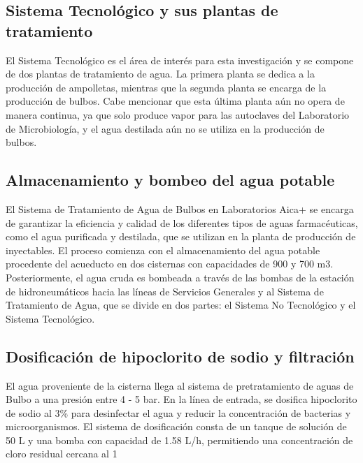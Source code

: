 
\subsection*{Sistema Tecnológico y sus plantas de tratamiento}

El Sistema Tecnológico es el área de interés para esta investigación y se compone de dos plantas de tratamiento de agua. La primera planta se dedica a la producción de ampolletas, mientras que la segunda planta se encarga de la producción de bulbos. Cabe mencionar que esta última planta aún no opera de manera continua, ya que solo produce vapor para las autoclaves del Laboratorio de Microbiología, y el agua destilada aún no se utiliza en la producción de bulbos.


\subsection{Almacenamiento y bombeo del agua potable}

El Sistema de Tratamiento de Agua de Bulbos en Laboratorios Aica+ se encarga de garantizar la eficiencia y calidad de los diferentes tipos de aguas farmacéuticas, como el agua purificada y destilada, que se utilizan en la planta de producción de inyectables. El proceso comienza con el almacenamiento del agua potable procedente del acueducto en dos cisternas con capacidades de 900 y 700 m3. Posteriormente, el agua cruda es bombeada a través de las bombas de la estación de hidroneumáticos hacia las líneas de Servicios Generales y al Sistema de Tratamiento de Agua, que se divide en dos partes: el Sistema No Tecnológico y el Sistema Tecnológico.


\subsection{Dosificación de hipoclorito de sodio y filtración}
 
El agua proveniente de la cisterna llega al sistema de pretratamiento de aguas de Bulbo a una presión entre 4 - 5 bar. En la línea de entrada, se dosifica hipoclorito de sodio al 3\% para desinfectar el agua y reducir la concentración de bacterias y microorganismos. El sistema de dosificación consta de un tanque de solución de 50 L y una bomba con capacidad de 1.58 L/h, permitiendo una concentración de cloro residual cercana al 1%

